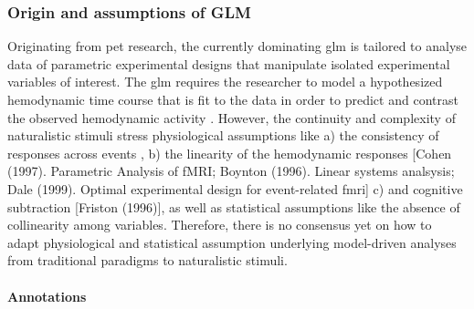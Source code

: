 \subsubsection{Origin and assumptions of GLM}
%
Originating from \ac{pet} research, the currently dominating \ac{glm} is
tailored to analyse data of parametric experimental designs that
manipulate isolated experimental variables of interest.
%
The \ac{glm} requires the researcher to model a hypothesized hemodynamic time
course that is fit to the data in order to predict and contrast the observed
hemodynamic activity \citep{friston1998event}.
%
However, the continuity and complexity of naturalistic stimuli stress
physiological assumptions like
%
a) the consistency of responses across events \citep[the basis for
\textit{trial-averaging};][]{dale1997selective},
%
b) the linearity of the hemodynamic responses [Cohen (1997). Parametric Analysis
of fMRI; Boynton (1996). Linear systems analsysis; Dale (1999). Optimal
experimental design for event-related fmri]
%
c) and cognitive subtraction [Friston (1996)],
%
as well as statistical assumptions like the absence of collinearity among
variables.
%
Therefore, there is no consensus yet on how to adapt physiological and
statistical assumption underlying model-driven analyses from traditional
paradigms to naturalistic stimuli.


\paragraph{Annotations}

